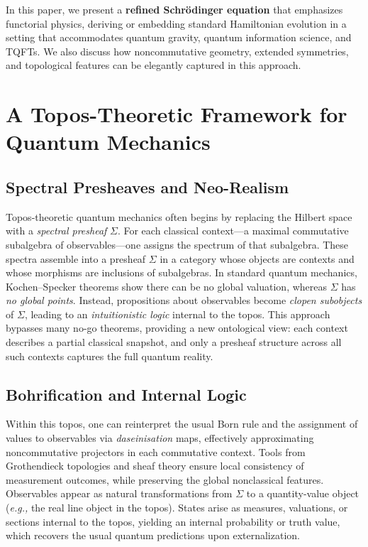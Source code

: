 \documentclass[12pt]{article}
\begin{document}
In this paper, we present a \textbf{refined Schr\"odinger equation}
that emphasizes functorial physics, deriving or embedding standard
Hamiltonian evolution in a setting that accommodates quantum gravity,
quantum information science, and TQFTs. We also discuss how
noncommutative geometry, extended symmetries, and topological
features can be elegantly captured in this approach.

\section{A Topos-Theoretic Framework for Quantum Mechanics}
\subsection{Spectral Presheaves and Neo-Realism}
Topos-theoretic quantum mechanics often begins by replacing the
Hilbert space with a \emph{spectral presheaf} $\Sigma$. For each
classical context---a maximal commutative subalgebra of observables---one
assigns the spectrum of that subalgebra. These spectra assemble into
a presheaf $\Sigma$ in a category whose objects are contexts and
whose morphisms are inclusions of subalgebras. In standard quantum
mechanics, Kochen--Specker theorems show there can be no global
valuation, whereas $\Sigma$ has \emph{no global points}. Instead,
propositions about observables become \emph{clopen subobjects} of
$\Sigma$, leading to an \emph{intuitionistic logic} internal to the
topos. This approach bypasses many no-go theorems, providing a new
ontological view: each context describes a partial classical snapshot,
and only a presheaf structure across all such contexts captures the
full quantum reality.

\subsection{Bohrification and Internal Logic}
Within this topos, one can reinterpret the usual Born rule and
the assignment of values to observables via \emph{daseinisation}
maps, effectively approximating noncommutative projectors in each
commutative context. Tools from Grothendieck topologies and sheaf
theory ensure local consistency of measurement outcomes, while
preserving the global nonclassical features. Observables appear
as natural transformations from $\Sigma$ to a quantity-value
object (\emph{e.g.,} the real line object in the topos). States
arise as measures, valuations, or sections internal to the topos,
yielding an internal probability or truth value, which recovers
the usual quantum predictions upon externalization.
\end{document}
